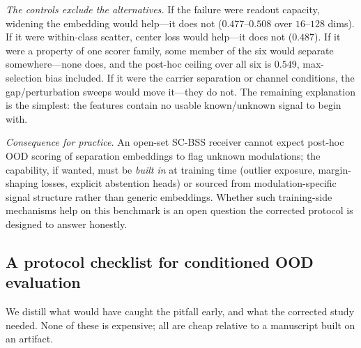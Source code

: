 \documentclass[review,12pt]{elsarticle}
\begin{document}
\emph{The controls exclude the alternatives.} If the failure were
readout capacity, widening the embedding would help---it does not
($0.477$--$0.508$ over $16$--$128$ dims). If it were within-class
scatter, center loss would help---it does not ($0.487$). If it were a
property of one scorer family, some member of the six would separate
somewhere---none does, and the post-hoc ceiling over all six is
$0.549$, max-selection bias included. If it were the carrier
separation or channel conditions, the gap/perturbation sweeps would
move it---they do not. The remaining explanation is the simplest: the
features contain no usable known/unknown signal to begin with.

\emph{Consequence for practice.} An open-set SC-BSS receiver cannot
expect post-hoc OOD scoring of separation embeddings to flag unknown
modulations; the capability, if wanted, must be \emph{built in} at
training time (outlier exposure, margin-shaping losses, explicit
abstention heads) or sourced from modulation-specific signal structure
rather than generic embeddings. Whether such training-side mechanisms
help on this benchmark is an open question the corrected protocol is
designed to answer honestly.

\subsection{A protocol checklist for conditioned OOD evaluation}

We distill what would have caught the pitfall early, and what the
corrected study needed. None of these is expensive; all are cheap
relative to a manuscript built on an artifact.
\end{document}
